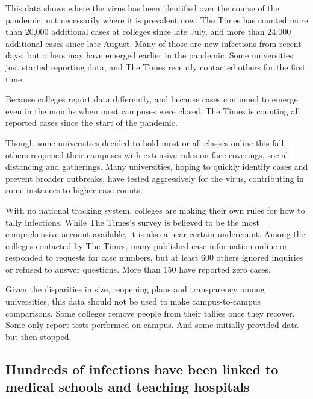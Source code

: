 This data shows where the virus has been identified over the course of
the pandemic, not necessarily where it is prevalent now. The Times has
counted more than 20,000 additional cases at colleges
\href{https://www.nytimes3xbfgragh.onion/interactive/2020/07/28/us/covid-19-colleges-universities.html}{since
late July}, and more than 24,000 additional cases since late August.
Many of those are new infections from recent days, but others may have
emerged earlier in the pandemic. Some universities just started
reporting data, and The Times recently contacted others for the first
time.

Because colleges report data differently, and because cases continued to
emerge even in the months when most campuses were closed, The Times is
counting all reported cases since the start of the pandemic.

Though some universities decided to hold most or all classes online this
fall, others reopened their campuses with extensive rules on face
coverings, social distancing and gatherings. Many universities, hoping
to quickly identify cases and prevent broader outbreaks, have tested
aggressively for the virus, contributing in some instances to higher
case counts.

With no national tracking system, colleges are making their own rules
for how to tally infections. While The Times's survey is believed to be
the most comprehensive account available, it is also a near-certain
undercount. Among the colleges contacted by The Times, many published
case information online or responded to requests for case numbers, but
at least 600 others ignored inquiries or refused to answer questions.
More than 150 have reported zero cases.

Given the disparities in size, reopening plans and transparency among
universities, this data should not be used to make campus-to-campus
comparisons. Some colleges remove people from their tallies once they
recover. Some only report tests performed on campus. And some initially
provided data but then stopped.

\hypertarget{hundreds-of-infections-have-been-linked-to-medical-schools-and-teaching-hospitals}{%
\subsection{Hundreds of infections have been linked to medical schools
and teaching
hospitals}\label{hundreds-of-infections-have-been-linked-to-medical-schools-and-teaching-hospitals}}

